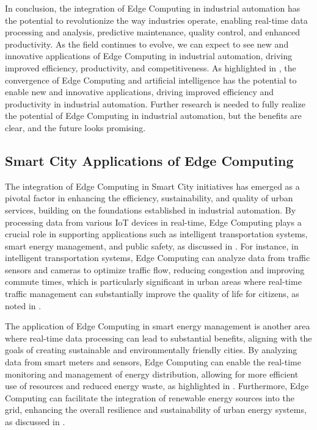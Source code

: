 \documentclass[11pt,a4paper]{article}
\begin{document}
In conclusion, the integration of Edge Computing in industrial automation has the potential to revolutionize the way industries operate, enabling real-time data processing and analysis, predictive maintenance, quality control, and enhanced productivity. As the field continues to evolve, we can expect to see new and innovative applications of Edge Computing in industrial automation, driving improved efficiency, productivity, and competitiveness. As highlighted in \cite{arxiv:1909.00560}, the convergence of Edge Computing and artificial intelligence has the potential to enable new and innovative applications, driving improved efficiency and productivity in industrial automation. Further research is needed to fully realize the potential of Edge Computing in industrial automation, but the benefits are clear, and the future looks promising.


\subsection{Smart City Applications of Edge Computing}


The integration of Edge Computing in Smart City initiatives has emerged as a pivotal factor in enhancing the efficiency, sustainability, and quality of urban services, building on the foundations established in industrial automation. By processing data from various IoT devices in real-time, Edge Computing plays a crucial role in supporting applications such as intelligent transportation systems, smart energy management, and public safety, as discussed in \cite{arxiv:1909.08747}. For instance, in intelligent transportation systems, Edge Computing can analyze data from traffic sensors and cameras to optimize traffic flow, reducing congestion and improving commute times, which is particularly significant in urban areas where real-time traffic management can substantially improve the quality of life for citizens, as noted in \cite{arxiv:1909.08747}.

The application of Edge Computing in smart energy management is another area where real-time data processing can lead to substantial benefits, aligning with the goals of creating sustainable and environmentally friendly cities. By analyzing data from smart meters and sensors, Edge Computing can enable the real-time monitoring and management of energy distribution, allowing for more efficient use of resources and reduced energy waste, as highlighted in \cite{arxiv:2112.01250}. Furthermore, Edge Computing can facilitate the integration of renewable energy sources into the grid, enhancing the overall resilience and sustainability of urban energy systems, as discussed in \cite{arxiv:1808.05283}.
\end{document}
